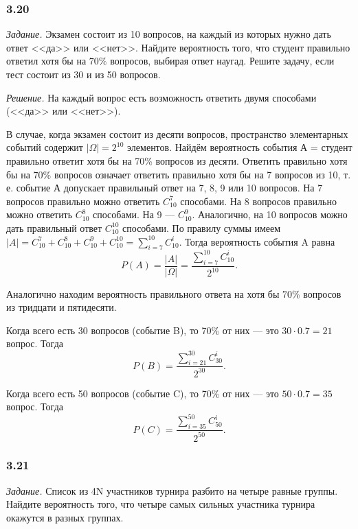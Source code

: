 \subsubsection*{3.20}

\textit{Задание.} Экзамен состоит из 10 вопросов, на каждый из которых нужно дать ответ <<да>> или <<нет>>.
Найдите вероятность того, что студент правильно ответил хотя бы на $ 70 \% $ вопросов, выбирая ответ наугад.
Решите задачу, если тест состоит из 30 и из 50 вопросов.

\textit{Решение.} На каждый вопрос есть возможность ответить двумя способами (<<да>> или <<нет>>).

В случае, когда экзамен состоит из десяти вопросов, пространство элементарных событий содержит $ | \Omega | = 2^{10} $ элементов.
Найдём вероятность события А = {студент правильно ответит хотя бы на 70\% вопросов из десяти}.
Ответить правильно хотя бы на 70\% вопросов означает ответить правильно хотя бы на 7 вопросов из 10, т. е. событие А допускает правильный ответ на 7, 8, 9 или 10 вопросов.
На 7 вопросов правильно можно ответить $ C_{10}^7 $ способами.
На 8 вопросов правильно можно ответить $ C_{10}^8 $ способами.
На 9 --- $ C_{10}^9 $.
Аналогично, на 10 вопросов можно дать правильный ответ $ C_{10}^{10} $ способами.
По правилу суммы имеем $ |A| = C_{10}^7 + C_{10}^8 + C_{10}^9 + C_{10}^{10} = \sum \limits_{i=7}^{10} C_{10}^i $.
Тогда вероятность события A равна
$$ P \left( A \right) =
\frac{|A|}{| \Omega |} =
\frac{ \sum \limits_{i=7}^{10} C_{10}^i}{2^{10}}.$$

Аналогично находим вероятность правильного ответа на хотя бы 70\% вопросов из тридцати и пятидесяти.

Когда всего есть 30 вопросов (событие B), то 70\% от них --- это $ 30 \cdot 0.7 = 21$ вопрос.
Тогда
$$ P \left( B \right) =
\frac{ \sum \limits_{i=21}^{30} C_{30}^i}{2^{30}}.$$

Когда всего есть 50 вопросов (событие C), то 70\% от них --- это $ 50 \cdot 0.7 = 35$ вопрос.
Тогда
$$ P \left( C \right) =
\frac{ \sum \limits_{i=35}^{50} C_{50}^i}{2^{50}}.$$

\subsubsection*{3.21}

\textit{Задание.} Список из 4N участников турнира разбито на четыре равные группы.
Найдите вероятность того, что четыре самых сильных участника турнира окажутся в разных группах. 

